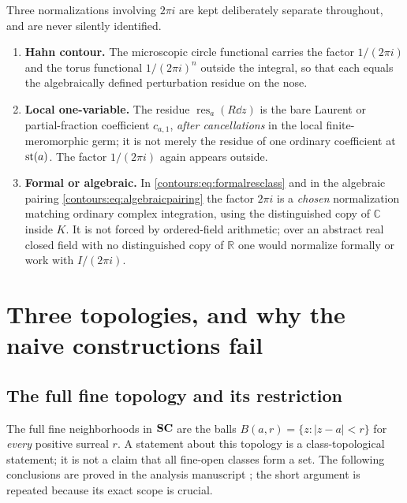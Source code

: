 \documentclass[11pt,letterpaper]{article}
\theoremstyle{definition}
\theoremstyle{remark}
\newcommand{\R}{\mathbb R}\newcommand{\C}{\mathbb C}\newcommand{\Q}{\mathbb Q}
\newcommand{\res}{\operatorname{res}}\newcommand{\wind}{\operatorname{wind}}
\numberwithin{equation}{section}
\begin{document}
Three normalizations involving $2\pi i$ are kept deliberately separate throughout,
and are never silently identified.
\begin{enumerate}
\item \textbf{Hahn contour.} The microscopic circle functional carries the factor
$1/(2\pi i)$ and the torus functional $1/(2\pi i)^n$ outside the integral, so that
each equals the algebraically defined perturbation residue on the nose.
\item \textbf{Local one-variable.} The residue $\res_a(R\dd z)$ is the bare
Laurent or partial-fraction coefficient $c_{a,1}$, \emph{after cancellations} in
the local finite-meromorphic germ; it is not merely the residue of one ordinary
coefficient at $\operatorname{st}(a)$. The factor $1/(2\pi i)$ again appears outside.
\item \textbf{Formal or algebraic.} In \eqref{contours:eq:formalresclass} and in
the algebraic pairing \eqref{contours:eq:algebraicpairing} the factor $2\pi i$ is a
\emph{chosen} normalization matching ordinary complex integration, using the
distinguished copy of $\C$ inside $K$. It is not forced by ordered-field
arithmetic; over an abstract real closed field with no distinguished copy of $\R$
one would normalize formally or work with $I/(2\pi i)$.
\end{enumerate}

\section{Three topologies, and why the naive constructions fail}
\label{contours:sec:topologies}

\subsection{The full fine topology and its restriction}
The full fine neighborhoods in $\mathbf{SC}$ are the balls $B(a,r)=\{z:|z-a|<r\}$ for
\emph{every} positive surreal $r$. A statement about this topology is a
class-topological statement; it is not a claim that all fine-open classes form a
set. The following conclusions are proved in the analysis manuscript
\cite[\S3]{Analysis}; the short argument is repeated because its exact scope is
crucial.
\end{document}
